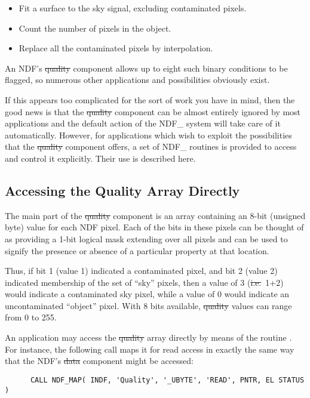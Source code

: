 \begin{itemize}
\item Fit a surface to the sky signal, excluding contaminated pixels.
\item Count the number of pixels in the object.
\item Replace all the contaminated pixels by interpolation.
\end{itemize}

An NDF's \st{quality\/} component allows up to eight such binary conditions to be
flagged, so numerous other applications and possibilities obviously exist. 

If this appears too complicated for the sort of work you have in mind, then  the
good news is that the \st{quality\/} component can be almost entirely ignored  by
most applications and the default action of the NDF\_ system will take  care of
it automatically.
However, for applications which wish to exploit the possibilities that the 
\st{quality\/} component offers, a set of NDF\_ routines is provided to access
and  control it explicitly.
Their use is described here.

\subsection{Accessing the Quality Array Directly}

The main part of the \st{quality\/} component is an array containing an 8-bit 
(unsigned byte) value for each NDF pixel.
Each of the bits in these pixels can be thought of as providing a 1-bit 
logical mask extending over all pixels and can be used to signify the 
presence or absence of a particular property at that location.

Thus, if bit 1 (value 1) indicated a contaminated pixel, and bit 2 (value 2) 
indicated membership of the set of ``sky'' pixels, then a value of 3
(\st{i.e.}\ 1+2) would indicate a contaminated sky pixel, while a
value of 0 
would indicate an uncontaminated ``object'' pixel. 
With 8 bits available, \st{quality\/} values can range from 0 to 255.

An application may access the \st{quality\/} array directly by means of the
routine  .
For instance, the following call maps it for read access in exactly the same 
way that the NDF's \st{data\/} component might be accessed:

\small
\begin{verbatim}
      CALL NDF_MAP( INDF, 'Quality', '_UBYTE', 'READ', PNTR, EL STATUS )
\end{verbatim}
\normalsize

